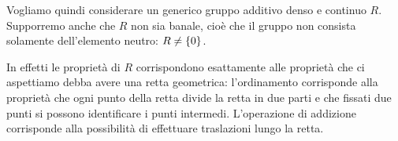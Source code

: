 Vogliamo quindi considerare un generico gruppo additivo 
denso e continuo $R$. 
Supporremo anche che $R$ non sia banale, cioè che il gruppo non
consista solamente dell'elemento neutro: $R\neq {\left\{ 0 \right\}}$.

In effetti le proprietà di $R$ corrispondono esattamente 
alle proprietà che ci aspettiamo debba avere una retta geometrica:
l'ordinamento corrisponde alla proprietà che ogni punto 
della retta divide la retta in due parti e che fissati due punti 
si possono identificare i punti intermedi.
L'operazione di addizione corrisponde alla possibilità 
di effettuare traslazioni lungo la retta.


